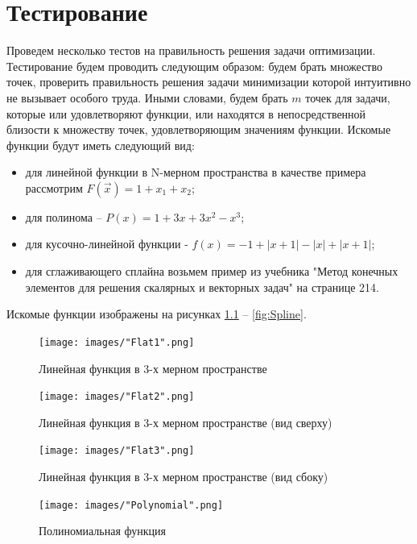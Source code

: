 \chapter{Тестирование}

Проведем несколько тестов на правильность решения задачи оптимизации. Тестирование будем проводить следующим образом: будем брать множество точек, проверить правильность решения задачи минимизации которой интуитивно не вызывает особого труда. Иными словами, будем брать $m$ точек для задачи, которые или удовлетворяют функции, или находятся в непосредственной близости к множеству точек, удовлетворяющим значениям функции.
Искомые функции будут иметь следующий вид:
\begin{itemize}
	\item для линейной функции в N-мерном пространства в качестве примера рассмотрим $F(\vec{x}) = 1 + x_1 + x_2$;
	\item для полинома -- $P(x) = 1 + 3x + 3x^2 - x^3$;
	\item для кусочно-линейной функции - $f(x) = -1 + |x+1|-|x|+|x+1|$;
	\item для сглаживающего сплайна возьмем пример из учебника "Метод конечных элементов для решения скалярных и векторных задач" на странице 214.
\end{itemize}

Искомые функции изображены на рисунках \ref{fig:LineN} -- \ref{fig:Spline}.

\begin{figure}
	\centering
	\vspace*{0.7cm}
	\texttt{[image: images/"Flat1".png]}
	\caption{Линейная функция в 3-х мерном пространстве}
	\label{fig:LineN}
\end{figure}


\begin{figure}
	\centering
	\vspace*{0.7cm}
	\texttt{[image: images/"Flat2".png]}
	\caption{Линейная функция в 3-х мерном пространстве (вид сверху)}
	\label{fig:LineN1}
\end{figure}


\begin{figure}
	\centering
	\vspace*{0.7cm}
	\texttt{[image: images/"Flat3".png]}
	\caption{Линейная функция в 3-х мерном пространстве (вид сбоку)}
	\label{fig:LineN2}
\end{figure}


\begin{figure}
	\centering
	\vspace*{0.7cm}
	\texttt{[image: images/"Polynomial".png]}
	\caption{Полиномиальная функция}
	\label{fig:Polynomial}
\end{figure}

